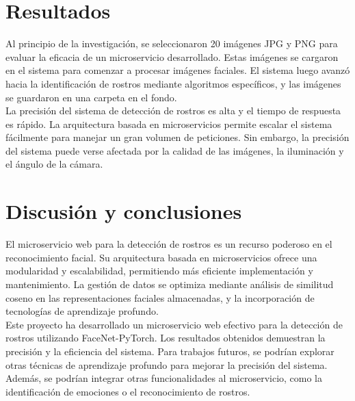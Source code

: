 \documentclass[12pt]{article}
\begin{document}
\section{Resultados}
Al principio de la investigación, se seleccionaron 20 imágenes JPG y PNG para evaluar la eficacia de un microservicio desarrollado. Estas imágenes se cargaron en el sistema para comenzar a procesar imágenes faciales. El sistema luego avanzó hacia la identificación de rostros mediante algoritmos específicos, y las imágenes se guardaron en una carpeta en el fondo.
\\La precisión del sistema de detección de rostros es alta y el tiempo de respuesta es rápido. La arquitectura basada en microservicios permite escalar el sistema fácilmente para manejar un gran volumen de peticiones. Sin embargo, la precisión del sistema puede verse afectada por la calidad de las imágenes, la iluminación y el ángulo de la cámara.

\section{Discusión y conclusiones}
El microservicio web para la detección de rostros es un recurso poderoso en el reconocimiento facial. Su arquitectura basada en microservicios ofrece una modularidad y escalabilidad, permitiendo más eficiente implementación y mantenimiento. La gestión de datos se optimiza mediante análisis de similitud coseno en las representaciones faciales almacenadas, y la incorporación de tecnologías de aprendizaje profundo.
\\
Este proyecto ha desarrollado un microservicio web efectivo para la detección de rostros utilizando FaceNet-PyTorch. Los resultados obtenidos demuestran la precisión y la eficiencia del sistema. Para trabajos futuros, se podrían explorar otras técnicas de aprendizaje profundo para mejorar la precisión del sistema. Además, se podrían integrar otras funcionalidades al microservicio, como la identificación de emociones o el reconocimiento de rostros.
\end{document}
